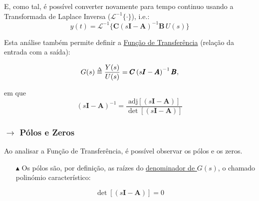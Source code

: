 \noindent E, como tal, é possível converter novamente para tempo continuo usando a Transformada de Laplace Inversa ($\mathcal{L}^{-1}\{\cdot\}$), i.e.:
$$
    y(t) = \mathcal{L}^{-1}\{\pmb{C}\left( s\pmb{I}-\pmb{A} \right)^{-1}\pmb{B}\,U(s)\}
$$

\vspace{-0.5em}
{

\begin{mdframed}
    \noindent Esta análise também permite definir a \underline{Função de Transferência} (relação da entrada com a saída):
    
    \vspace{-0.5em}
    $$
        G(s) \delequal \frac{Y(s)}{U(s)} = \pmb{C}\left( s\pmb{I}-\pmb{A} \right)^{-1}\pmb{B},
    $$
\end{mdframed}
}

\noindent em que
$$
    \left( s\pmb{I}-\pmb{A} \right)^{-1} = \frac{\text{adj}\left[(s\pmb{I}-\pmb{A}) \right]}{\det\left[( s\pmb{I}-\pmb{A}) \right]}
$$

{

}

\vspace{-1em}
\subsubsection[1.1.2 Pólos e Zeros]{$\pmb{\rightarrow}$ Pólos e Zeros}
\label{subsec:poles-and-zeroes}

\noindent Ao analisar a Função de Transferência, é possível observar os pólos e os zeros.
\begin{enumerate}
    \item[$\blacktriangle$] Os pólos são, por definição, as raízes do \underline{denominador de $G(s)$}, o chamado polinómio característico:
\end{enumerate}
\vspace{-0.5em}
$$
    \det\left[( s\pmb{I}-\pmb{A}) \right] = 0
$$

